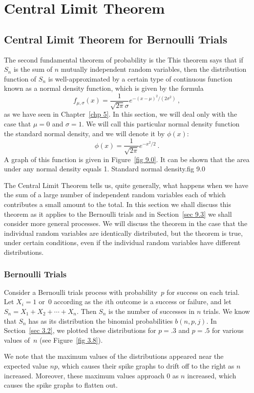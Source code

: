 \chapter {Central Limit Theorem}\label{chp 9} 
\section[Bernoulli Trials]{Central Limit Theorem for Bernoulli Trials}\label{sec 9.1}
The second fundamental theorem of probability is the    This theorem says that if $S_n$ is the sum of $n$
mutually independent random variables, then the distribution function of $S_n$ is
well-approximated by a certain type of continuous function known as a normal density
function, which is given by the formula
$$f_{\mu,\sigma}(x) = \frac{1}{\sqrt {2\pi}\sigma}e^{-(x-\mu)^2/(2\sigma^2)}\ ,$$
as we have seen in Chapter~\ref{chp 5}.  In this section, we will deal only with the case 
that $\mu = 0$ and $\sigma = 1$.  We will call this particular normal density function the 
{\emx standard} normal density, and we will denote it by $\phi(x)$:
$$\phi(x) = \frac {1}{\sqrt{2\pi}}e^{-x^2/2}\ .$$
A graph of this function is given in Figure~\ref{fig 9.0}.  It can be shown that the area
under any normal density equals 1.
{Standard normal density.}{fig 9.0} 
\par
The Central Limit Theorem tells us, quite generally, what
happens when we have the sum of a large number of independent random variables
each of which contributes a small amount to the total.  In this section we
shall discuss this theorem as it applies to the Bernoulli trials and in
Section~\ref{sec 9.3} we shall consider more general processes.  We will discuss
the theorem in the case that the individual random variables are identically
distributed, but the theorem is true, under certain conditions, even if the individual
random variables have different distributions.


\subsection*{Bernoulli Trials}
Consider a Bernoulli trials process with probability~$p$ for success on each
trial.  Let $X_i = 1$ or~0 according as the $i$th outcome is a success or
failure, and let $S_n = X_1 + X_2 +\cdots+ X_n$.  Then $S_n$ is the number of
successes in $n$ trials.  We know that $S_n$ has as its distribution the binomial
probabilities $b(n,p,j)$.  In Section~\ref{sec 3.2}, we plotted these
distributions for $p = .3$ and $p = .5$ for various values of~$n$ (see Figure~\ref{fig 3.8}).
\par
We note that the maximum values of the distributions appeared near the expected
value $np$, which causes their spike graphs to drift off to the right as
$n$ increased.  Moreover, these maximum values approach 0 as $n$ increased,
which causes the spike graphs to flatten out.

